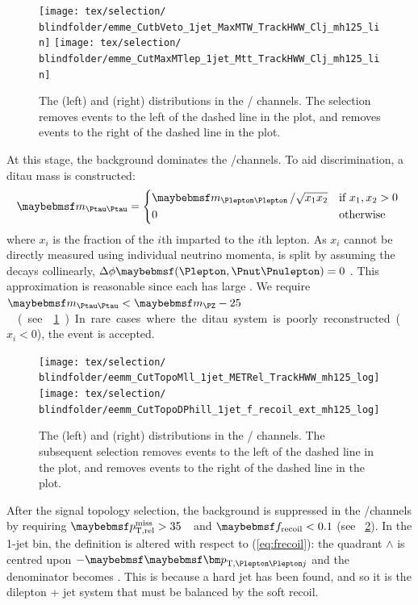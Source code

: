 \begin{figure}[t]
	\texttt{[image: tex/selection/\\blindfolder/emme\_CutbVeto\_1jet\_MaxMTW\_TrackHWW\_Clj\_mh125\_lin]}
	\hfill
	\texttt{[image: tex/selection/\\blindfolder/emme\_CutMaxMTlep\_1jet\_Mtt\_TrackHWW\_Clj\_mh125\_lin]}
	\caption{The \maxmtw (left) and \mtautau (right) distributions in the \emch/\mech 
	channels. The selection removes events to the left of the dashed line in the \maxmtw 
	plot, and removes events to the right of the dashed line in the \mtautau plot.}
	\label{fig:sel:1j:df_cuts}
\end{figure}

At this stage, the \DYtt background dominates the \emch/\mech channels. To aid 
discrimination, a ditau mass is constructed:
\begin{equation}
	\mtautau = 
		\begin{dcases*}
			\mll \,/ \sqrt{x_1 x_2} & if $x_1, x_2 > 0$ \\
			0 & otherwise
		\end{dcases*}
\end{equation}
where $x_i$ is the \pt fraction of the $i$th \Ptau imparted to the $i$th lepton. As $x_i$ 
cannot be directly measured using individual neutrino momenta, \corrtrackmet is split by 
assuming the \Ptau decays collinearly, \ie 
$\Delta\phi\parenths{\Plepton,\HepProcess{\Pnut\Pnulepton}} = 0$ \cite{Tau:collinear}. 
This approximation is reasonable since each \Ptau has large \pt. We require 
\unit{$\mtautau < \mZ - 25$}{\GeV} (see \Figure~\ref{fig:sel:1j:df_cuts}). In rare cases 
where the ditau system is poorly reconstructed (\ie $x_i < 0$), the event is accepted.

\begin{figure}[b]
	\texttt{[image: tex/selection/\\blindfolder/eemm\_CutTopoMll\_1jet\_METRel\_TrackHWW\_mh125\_log]}
	\hfill
	\texttt{[image: tex/selection/\\blindfolder/eemm\_CutTopoDPhill\_1jet\_f\_recoil\_ext\_mh125\_log]}
	\caption{The \trackmetrel (left) and \frecoil (right) distributions in the \eech/\mmch 
	channels. The subsequent selection removes events to the left of the dashed line in the 
	\trackmetrel plot, and removes events to the right of the dashed line in the \frecoil 
	plot.}
	\label{fig:sel:1j:sf_cuts}
\end{figure}

After the signal topology selection, the \DYll background is suppressed in the 
\eech/\mmch channels by requiring \unit{$\trackmetrel > 35$}{\GeV} and $\frecoil < 0.1$ 
(see \Figure~\ref{fig:sel:1j:sf_cuts}). In the 1-jet bin, the \frecoil definition is 
altered with respect to (\ref{eq:frecoil}): the quadrant $\wedge$ is centred upon 
$-\ptlljvec$ and the denominator becomes \ptllj. This is because a hard jet has been 
found, and so it is the dilepton + jet system that must be balanced by the soft recoil.

